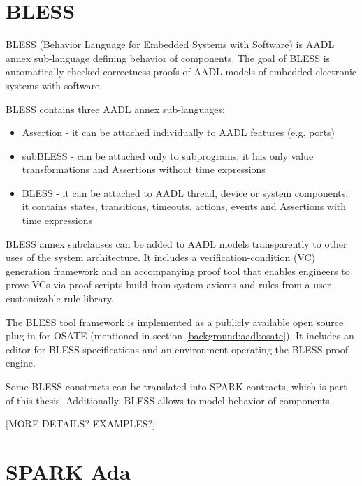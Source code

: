 \section{BLESS}
\label{background:bless}
BLESS (Behavior Language for Embedded Systems with Software) is AADL annex sub-language defining behavior of components. The goal of BLESS is automatically-checked correctness proofs of AADL models of embedded electronic systems with software.

BLESS contains three AADL annex sub-languages:
\begin{itemize} \itemsep1pt \parskip0pt 
	\item Assertion - it can be attached individually to AADL features (e.g. ports)
	\item subBLESS - can be attached only to subprograms; it has only value transformations and Assertions without time expressions
	\item BLESS - it can be attached to AADL thread, device or system components; it contains states, transitions, timeouts, actions, events and Assertions with time expressions
\end{itemize}

BLESS annex subclauses can be added to AADL models transparently to other uses of the system architecture. It includes a verification-condition (VC) generation framework and an accompanying proof tool that enables engineers to prove VCs via proof scripts build from system axioms and rules from a user-customizable rule library. \cite{Bless:Paper}

The BLESS tool framework is implemented as a publicly available open source plug-in for OSATE (mentioned in section \ref{background:aadl:osate}). It includes an editor for BLESS specifications and an environment operating the BLESS proof engine. \cite{Bless:Paper}

Some BLESS constructs can be translated into SPARK contracts, which is part of this thesis. Additionally, BLESS allows to model behavior of components.

[MORE DETAILS? EXAMPLES?]



\section{SPARK Ada}
\label{background:spark}


